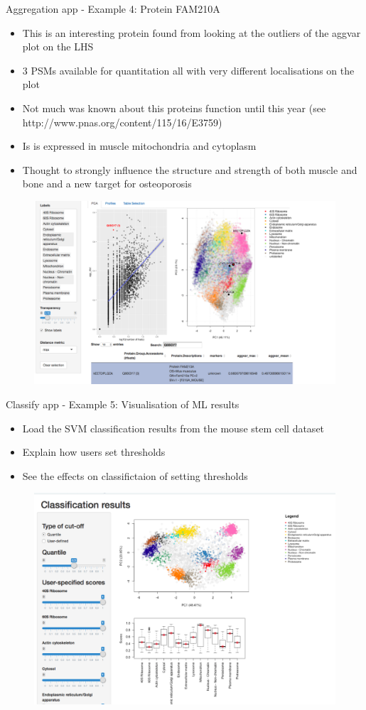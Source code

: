 \documentclass[bigger]{beamer}
\begin{document}
\begin{frame}{Aggregation app - Example 4: Protein FAM210A}
\smallskip
\footnotesize {
  \begin{itemize}
  \item This is an interesting protein found from looking at the outliers of the aggvar plot on the LHS
  \item 3 PSMs available for quantitation all with very different localisations on the plot
  \item Not much was known about this proteins function until this year (see http://www.pnas.org/content/115/16/E3759)
  \item Is is expressed in muscle mitochondria and cytoplasm
  \item Thought to strongly influence the structure and strength of both muscle and bone and a new target for osteoporosis
  \end{itemize}
  }
  \begin{figure}
    \includegraphics[height=.4\linewidth]{Figures/agg-app.png}
  \end{figure}
\end{frame}


\begin{frame}{Classify app - Example 5: Visualisation of ML results}
\smallskip
\footnotesize {
  \begin{itemize}
  \item Load the SVM classification results from the mouse stem cell dataset
  \item Explain how users set thresholds
  \item See the effects on classifictaion of setting thresholds
    \end{itemize}
  }
  \begin{figure}
      \includegraphics[width=.7\linewidth]{Figures/classify-app.png}
  \end{figure}
\end{frame}
\end{document}
